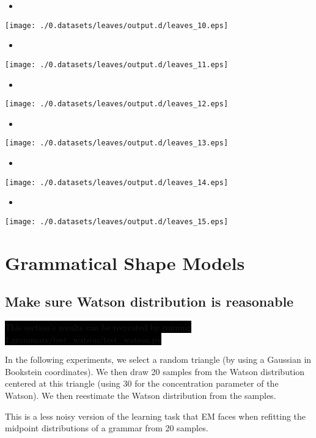 \documentclass{book}
\newcommand{\bow}[1]{\colorbox{black}{\color{white} #1}}
\newcommand{\experiment}[1]{\bow{This section's results can be recreated by running #1}}
\begin{document}
\begin{itemize}
\item 
\end{itemize}
\texttt{[image: ./0.datasets/leaves/output.d/leaves\_10.eps]}

\begin{itemize}
\item 
\end{itemize}
\texttt{[image: ./0.datasets/leaves/output.d/leaves\_11.eps]}

\begin{itemize}
\item 
\end{itemize}
\texttt{[image: ./0.datasets/leaves/output.d/leaves\_12.eps]}

\begin{itemize}
\item 
\end{itemize}
\texttt{[image: ./0.datasets/leaves/output.d/leaves\_13.eps]}

\begin{itemize}
\item 
\end{itemize}
\texttt{[image: ./0.datasets/leaves/output.d/leaves\_14.eps]}

\begin{itemize}
\item 
\end{itemize}
\texttt{[image: ./0.datasets/leaves/output.d/leaves\_15.eps]}
\section{Grammatical Shape Models}
\label{sec-3_2}
\subsection{Make sure Watson distribution is reasonable}
\label{sec-3_2_1}

\experiment{1.grammars/test\_watson/test\_watson.py}

In the following experiments, we select a random triangle (by using a
Gaussian in Bookstein coordinates). We then draw 20 samples from the
Watson distribution centered at this triangle (using 30 for the
concentration parameter of the Watson). We then reestimate the Watson
distribution from the samples.

This is a less noisy version of the learning task that EM faces when
refitting the midpoint distributions of a grammar from 20 samples.
\end{document}
